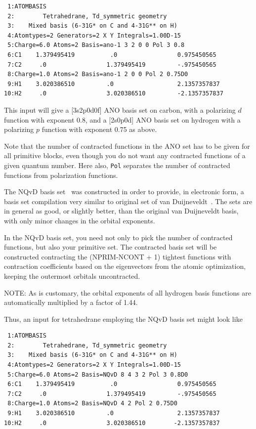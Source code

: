 \begin{verbatim}
 1:ATOMBASIS
 2:        Tetrahedrane, Td_symmetric geometry
 3:    Mixed basis (6-31G* on C and 4-31G** on H)
 4:Atomtypes=2 Generators=2 X Y Integrals=1.00D-15
 5:Charge=6.0 Atoms=2 Basis=ano-1 3 2 0 0 Pol 3 0.8
 6:C1    1.379495419          .0                 0.975450565
 7:C2     .0                 1.379495419         -.975450565
 8:Charge=1.0 Atoms=2 Basis=ano-1 2 0 0 Pol 2 0.75D0
 9:H1    3.020386510         .0                  2.1357357837
10:H2     .0                 3.020386510         -2.1357357837
\end{verbatim}

This input will give a [3s2p0d0f] ANO basis set
on carbon, with a
polarizing $d$ function with exponent 0.8, and a [2s0p0d] ANO basis
set on hydrogen with a polarizing $p$ function with exponent 0.75 as
above.

Note that the number of contracted functions in the ANO
set has to be
given for all primitive blocks, even though you do not want any
contracted functions of a given quantum number. Here also, {\tt Pol}
separates the number of contracted functions from polarization
functions.

The NQvD basis set~\cite{nqvdref} was constructed in order to provide,
in electronic form, a basis set compilation very similar to original
set of van Duijneveldt~\cite{fbvdibmrap}.
The sets are in general as good, or slightly better, than the original
van Duijneveldt basis, with only minor changes in the orbital
exponents.

In the NQvD basis set, you need not only to pick the number of
contracted functions, but also your primitive set. The contracted
basis set will be constructed contracting the (NPRIM-NCONT + 1)
tightest functions with contraction coefficients based on the
eigenvectors from the atomic optimization, keeping the outermost
orbitals uncontracted.

NOTE: As is customary, the orbital exponents of all hydrogen basis
functions are automatically multiplied by a factor of 1.44.

Thus, an input for tetrahedrane employing the NQvD basis set might
look like

\begin{verbatim}
 1:ATOMBASIS
 2:        Tetrahedrane, Td_symmetric geometry
 3:    Mixed basis (6-31G* on C and 4-31G** on H)
 4:Atomtypes=2 Generators=2 X Y Integrals=1.00D-15
 5:Charge=6.0 Atoms=2 Basis=NQvD 8 4 3 2 Pol 3 0.8D0
 6:C1    1.379495419          .0                 0.975450565
 7:C2     .0                 1.379495419         -.975450565
 8:Charge=1.0 Atoms=2 Basis=NQvD 4 2 Pol 2 0.75D0
 9:H1    3.020386510         .0                  2.1357357837
10:H2     .0                 3.020386510        -2.1357357837
\end{verbatim}

